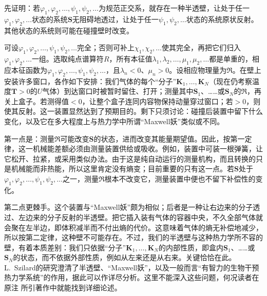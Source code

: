 \documentclass[fontsize=13pt,twoside,openany,headings=normal,parskip=false,bookmarkpackage=false,DIV=calc]{scrbook}
\newcommand{\textkaishu}[1]{{\zhkaishu #1}}
\begin{document}
先证明：若$\varphi_1,\allowbreak \varphi_2,\allowbreak \ldots,\allowbreak \psi_1,\allowbreak \psi_2,\allowbreak \ldots$为规范正交系，就存在一种半透壁，让处于任一$\varphi_1,\allowbreak \varphi_2,\allowbreak \ldots$状态的系统$\boldsymbol{S}$无阻碍地透过，让处于任一$\psi_1,\allowbreak \psi_2,\allowbreak \ldots$状态的系统原状反射。其他状态的系统则可能在碰撞壁时改变。

可设$\varphi_1,\allowbreak \varphi_2,\allowbreak \ldots,\allowbreak \psi_1,\allowbreak \psi_2,\allowbreak \ldots$完全；否则可补上$\chi_1,\allowbreak \chi_2,\allowbreak \ldots$使其完全，再把它们归入$\varphi_1,\allowbreak \varphi_2,\allowbreak \ldots$一组。选取纯点谱算符$R$，所有本征值$\lambda_1,\allowbreak \lambda_2,\allowbreak \ldots,\allowbreak \mu_1,\allowbreak \mu_2,\allowbreak \ldots$都是单重的，相应本征函数为$\varphi_1,\allowbreak \varphi_2,\allowbreak \ldots,\allowbreak \psi_1,\allowbreak \psi_2,\allowbreak \ldots$，且$\lambda_n<0$、$\mu_n>0$。设相应物理量为$\mathfrak R$。在壁上安装许多窗口，各作如下安排：我们气体的每个“分子”$\boldsymbol{K}_1,\allowbreak \ldots,\allowbreak \boldsymbol{K}_N$（现在仍考察温度$\mathbf T>0$的$U$气体）到达窗口时被暂时留住、打开；测量其中$\boldsymbol{S}_1$、……或$\boldsymbol{S}_N$的$\mathfrak R$，再关上盒子。若测得值$<0$，让整个盒子连同内容物保持动量穿过窗口；若$>0$，则使其反射。这一装置显然达到了预期目的。剩下只须讨论：碰撞后装置中留下什么变化，以及它在\hypertarget{origpage-197}{}\label{origpage-197}多大程度上与热力学中所谓“Maxwell妖”类似或不同。

第一点是：测量$\mathfrak R$可能改变$\boldsymbol{S}$的状态，进而改变其能量期望值。因此，按第一定律，这一机械能差额必须由测量装置供给或吸收。例如，装置中可装一根弹簧，让它松开、拉紧，或采用类似办法。由于这是纯自动运行的测量机构，而且转换的只是机械能而非热能，所以这里肯定没有熵变；目前重要的只有这一点。若$\boldsymbol{S}$处于$\varphi_1,\allowbreak \varphi_2,\allowbreak \ldots,\allowbreak \psi_1,\allowbreak \psi_2,\allowbreak \ldots$之一，测量$\mathfrak R$根本不改变它，测量装置中便也不留下补偿性的变化。

第二点更棘手。这个装置与“Maxwell妖”颇为相似；后者是一种让右边来的分子透过、左边来的分子反射的半透壁。把它插入装有气体的容器中央，不久全部气体就会聚在左半边，即体积减半而不付出熵的代价。这意味着气体的熵无补偿地减少，所以按第二定律，这种壁不可能存在。不过，我们的半透壁与这种热力学所不容的壁，有着本质差别：我们只依据“分子”$\boldsymbol{K}_1,\allowbreak \ldots,\allowbreak \boldsymbol{K}_N$的内部性质，即盒内$\boldsymbol{S}_1$、……或$\boldsymbol{S}_N$的状态，而不依据外部性质，例如从左来还是从右来。关键恰恰在此。L.~Szilard的研究澄清了半透壁、“Maxwell妖”，以及一般而言“\textkaishu{有智力的生物干预热力学系统}”的作用，据此可以作详尽分析。这里不能深入这些问题，何况读者在原注 \hyperlink{note-194}{} 所引著作中就能找到详细论述。
\end{document}
